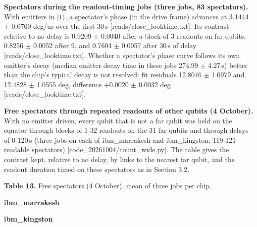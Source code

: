 \documentclass[11pt]{article}
\begin{document}
\textbf{Spectators during the readout-timing jobs (three jobs, 83 spectators).} With emitters in \(|1\rangle\), a spectator's phase (in the drive frame) advances at 3.1444 \(\pm\) 0.0760 deg/us over the first 30\,\textmu s {[}reads/close\_looktime.txt{]}. Its contrast relative to no delay is 0.9209 \(\pm\) 0.0040 after a block of 3 readouts on far qubits, 0.8256 \(\pm\) 0.0052 after 9, and 0.7604 \(\pm\) 0.0057 after 30\,\textmu s of delay {[}reads/close\_looktime.txt{]}. Whether a spectator's phase curve follows its own emitter's decay (median emitter decay time in these jobs 274.99 \(\pm\) 4.27\,\textmu s) better than the chip's typical decay is not resolved: fit residuals 12.8046 \(\pm\) 1.0979 and 12.4828 \(\pm\) 1.0555 deg, difference +0.0020 \(\pm\) 0.0032 deg {[}reads/close\_looktime.txt{]}.

\textbf{Free spectators through repeated readouts of other qubits (4 October).} With no emitter driven, every qubit that is not a far qubit was held on the equator through blocks of 1-32 readouts on the 31 far qubits and through delays of 0-120\,\textmu s (three jobs on each of ibm\_marrakesh and ibm\_kingston; 119-121 readable spectators) {[}code\_20261004/count\_wide.py{]}. The table gives the contrast kept, relative to no delay, by links to the nearest far qubit, and the readout duration timed on these spectators as in Section 3.2.

\textbf{Table 13.} Free spectators (4 October), mean of three jobs per chip.

\textbf{ibm\_marrakesh}

\par\smallskip\noindent{}\par\smallskip
\textbf{ibm\_kingston}
\end{document}
